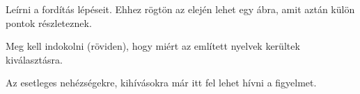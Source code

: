 
Leírni a fordítás lépéseit. Ehhez rögtön az elején lehet egy ábra, amit aztán külön pontok részleteznek.

Meg kell indokolni (röviden), hogy miért az említett nyelvek kerültek kiválasztásra.

Az esetleges nehézségekre, kihívásokra már itt fel lehet hívni a figyelmet.